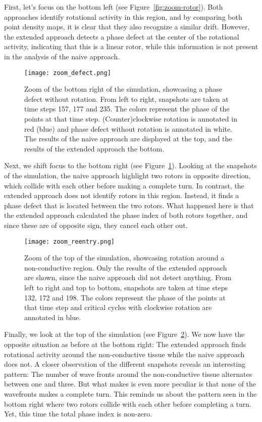 \documentclass[twocolumn]{article}
\begin{document}
First, let's focus on the bottom left (see Figure~\ref{fig:zoom-rotor}).
Both approaches identify rotational activity in this region, and by
comparing both point density maps, it is clear that they also recognize
a similar drift. However, the extended approach detects a phase defect
at the center of the rotational activity, indicating that this is a
linear rotor, while this information is not present in the analysis of
the naive approach.

\begin{figure}[ht]
  \centering
  \texttt{[image: zoom\_defect.png]}
  \caption{Zoom of the bottom right of the simulation, showcasing a phase
    defect without rotation. From left to right, snapshots are taken at time
    steps 157, 177 and 235. The colors represent the phase of the points at
    that time step. (Counter)clockwise rotation is annotated in red (blue)
    and phase defect without rotation is annotated in white. The results of
    the naive approach are displayed at the top, and the results of the
  extended approach the bottom.}
  \label{fig:zoom-defect}
\end{figure}

Next, we shift focus to the bottom right (see
Figure~\ref{fig:zoom-defect}). Looking at the snapshots of the simulation,
the naive approach highlight two rotors in opposite direction, which
collide with each other before making a complete turn. In contrast, the
extended approach does not identify rotors in this region. Instead, it
finds a phase defect that is located between the two rotors. What
happened here is that the extended approach calculated the phase index
of both rotors together, and since these are of opposite sign, they
cancel each other out.

\begin{figure}[ht]
  \centering
  \texttt{[image: zoom\_reentry.png]}
  \caption{Zoom of the top of the simulation, showcasing rotation around a
    non-conductive region. Only the results of the extended approach are
    shown, since the naive approach did not detect anything. From left to
    right and top to bottom, snapshots are taken at time steps 132, 172 and
    198. The colors represent the phase of the points at that time step and
  critical cycles with clockwise rotation are annotated in blue.}
  \label{fig:zoom-reentry}
\end{figure}

Finally, we look at the top of the simulation (see
Figure~\ref{fig:zoom-reentry}). We now have the opposite situation as
before at the bottom right: The extended approach finds rotational
activity around the non-conductive tissue while the naive approach does
not. A closer observation of the different snapshots reveals an
interesting pattern: The number of wave fronts around the non-conductive
tissue alternates between one and three. But what makes is even more
peculiar is that none of the wavefronts makes a complete turn. This
reminds us about the pattern seen in the bottom right where two rotors
collide with each other before completing a turn. Yet, this time the
total phase index is non-zero.
\end{document}
